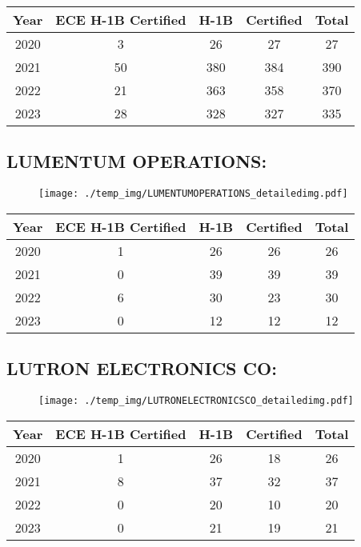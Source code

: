 \documentclass{article}%
\begin{document}
%
\begin{longtable}{c|c|c|c|c}%
\hline%
Year&ECE H{-}1B Certified&H{-}1B&Certified&Total\\%
\hline%
2020&3&26&27&27\\%
\hline%
2021&50&380&384&390\\%
\hline%
2022&21&363&358&370\\%
\hline%
2023&28&328&327&335\\%
\hline%
\end{longtable}

%
\newpage%
\subsection{LUMENTUM OPERATIONS:}%
\label{subsec:LUMENTUMOPERATIONS}%
\label{LUMENTUMOPERATIONSdetailed}%


\begin{figure}[htbp]%
\centering%
\texttt{[image: ./temp\_img/LUMENTUMOPERATIONS\_detailedimg.pdf]}%
\end{figure}

%
\begin{longtable}{c|c|c|c|c}%
\hline%
Year&ECE H{-}1B Certified&H{-}1B&Certified&Total\\%
\hline%
2020&1&26&26&26\\%
\hline%
2021&0&39&39&39\\%
\hline%
2022&6&30&23&30\\%
\hline%
2023&0&12&12&12\\%
\hline%
\end{longtable}

%
\newpage%
\subsection{LUTRON ELECTRONICS CO:}%
\label{subsec:LUTRONELECTRONICSCO}%
\label{LUTRONELECTRONICSCOdetailed}%


\begin{figure}[htbp]%
\centering%
\texttt{[image: ./temp\_img/LUTRONELECTRONICSCO\_detailedimg.pdf]}%
\end{figure}

%
\begin{longtable}{c|c|c|c|c}%
\hline%
Year&ECE H{-}1B Certified&H{-}1B&Certified&Total\\%
\hline%
2020&1&26&18&26\\%
\hline%
2021&8&37&32&37\\%
\hline%
2022&0&20&10&20\\%
\hline%
2023&0&21&19&21\\%
\hline%
\end{longtable}
\end{document}
